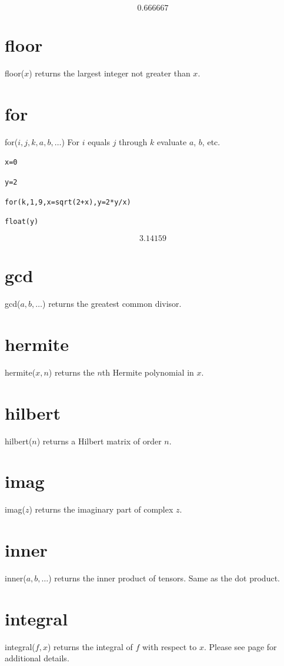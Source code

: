 \documentclass[12pt]{book}
\begin{document}
$$0.666667$$

\section*{floor}
floor($x$) returns the largest integer not greater than $x$.

\section*{for}
for($i,j,k,a,b,\ldots$) For $i$ equals $j$ through $k$ evaluate $a$, $b$, etc.

\medskip
{\tt x=0}

{\tt y=2}

{\tt for(k,1,9,x=sqrt(2+x),y=2*y/x)}

{\tt float(y)}

$$3.14159$$

\section*{gcd}
gcd($a,b,\ldots$) returns the greatest common divisor.

\section*{hermite}
hermite($x,n$) returns the $n$th Hermite polynomial in $x$.

\section*{hilbert}
hilbert($n$) returns a Hilbert matrix of order $n$.

\section*{imag}
imag($z$) returns the imaginary part of complex $z$.

\section*{inner}
inner($a,b,\ldots$) returns the inner product of tensors.
Same as the dot product.

\section*{integral}
integral($f,x$) returns the integral of $f$ with respect to $x$.
Please see page \pageref{integral} for additional details.
\end{document}
